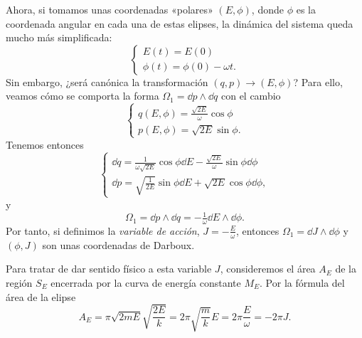   Ahora, si tomamos unas coordenadas «polares» $(E,\phi)$, donde $\phi$ es la coordenada angular en cada una de estas elipses, la dinámica del sistema queda mucho más simplificada: 
  \begin{equation*}
    \begin{cases}
    E(t)=E(0) \\
    \phi(t)=\phi(0)-\omega t.
  \end{cases}
  \end{equation*}
  Sin embargo, ¿será canónica la transformación $(q,p) \rightarrow (E,\phi)$? Para ello, veamos cómo se comporta la forma $\Omega_1=\dd p\wedge \dd q$ con el cambio
  \begin{equation*}
    \begin{cases}
      q(E,\phi)=\frac{\sqrt{2E}}{\omega}\cos\phi\\
      p(E,\phi)=\sqrt{2E}\sin \phi.
    \end{cases}
  \end{equation*}
  Tenemos entonces
  \begin{equation*}
    \begin{cases}
      \dd q= \frac{1}{\omega \sqrt{2E}}\cos \phi \dd E - \frac{\sqrt{2E}}{\omega} \sin \phi \dd \phi \\
      \dd p= \sqrt{\frac{1}{2E}}\sin \phi \dd E + \sqrt{2E} \cos \phi \dd \phi,
    \end{cases}
  \end{equation*}
  y 
  \begin{equation*}
    \Omega_1= \dd p \wedge \dd q = -\tfrac{1}{\omega} \dd E \wedge \dd \phi.
  \end{equation*}
  Por tanto, si definimos la \emph{variable de acción}, $J=-\frac{E}{\omega}$, entonces $\Omega_1=\dd J \wedge \dd \phi$ y $(\phi,J)$ son unas coordenadas de Darboux.

  Para tratar de dar sentido físico a esta variable $J$, consideremos el área $A_E$ de la región $S_E$ encerrada por la curva de energía constante $M_E$. Por la fórmula del área de la elipse
  \begin{equation*}
    A_E=\pi \sqrt{2mE} \sqrt{\frac{2E}{k}}=2\pi \sqrt{\frac{m}{k}} E= 2 \pi \frac{E}{\omega}= -2\pi J.
  \end{equation*}

